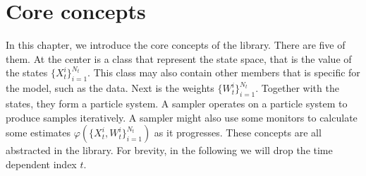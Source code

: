 %
%
%
%

\chapter{Core concepts}
\label{chap:Core concepts}

In this chapter, we introduce the core concepts of the library. There are five
of them. At the center is a class that represent the state space, that is the
value of the states $\{X_t^i\}_{i=1}^{N_t}$. This class may also contain other
members that is specific for the model, such as the data. Next is the weights
$\{W_t^i\}_{i=1}^{N_t}$. Together with the states, they form a particle system.
A sampler operates on a particle system to produce samples iteratively. A
sampler might also use some monitors to calculate some estimates
$\varphi(\{X_t^i,W_t^i\}_{i=1}^{N_t})$ as it progresses. These concepts are all
abstracted in the library. For brevity, in the following we will drop the time
dependent index $t$.

